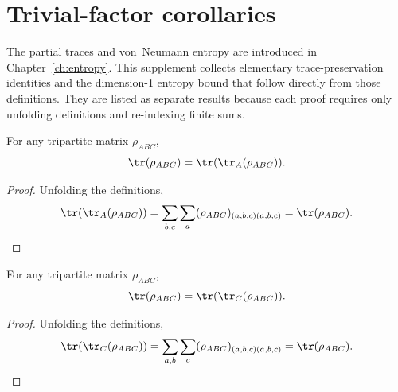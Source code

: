 
\section{Trivial-factor corollaries}

The partial traces and von~Neumann entropy are introduced in
Chapter~\ref{ch:entropy}. This supplement collects elementary
trace-preservation identities and the dimension-1 entropy bound that
follow directly from those definitions. They are listed as separate
results because each proof requires only unfolding definitions and
re-indexing finite sums.



\begin{theorem}
    \label{thm:trace_tracea_abc}
    \leanok
    For any tripartite matrix $\rho_{ABC}$,
    \[
        \tr(\rho_{ABC}) = \tr(\tr_A(\rho_{ABC})).
    \]
\end{theorem}

\begin{proof}\leanok
    Unfolding the definitions,
    \[
        \tr(\tr_A(\rho_{ABC}))
        = \sum_{b,c} \sum_{a}
        (\rho_{ABC})_{(a,b,c)(a,b,c)}
        = \tr(\rho_{ABC}).
    \]
\end{proof}


\begin{theorem}
    \label{thm:trace_tracec_abc}
    \leanok
    For any tripartite matrix $\rho_{ABC}$,
    \[
        \tr(\rho_{ABC}) = \tr(\tr_C(\rho_{ABC})).
    \]
\end{theorem}

\begin{proof}\leanok
    Unfolding the definitions,
    \[
        \tr(\tr_C(\rho_{ABC}))
        = \sum_{a,b} \sum_{c}
        (\rho_{ABC})_{(a,b,c)(a,b,c)}
        = \tr(\rho_{ABC}).
    \]
\end{proof}


